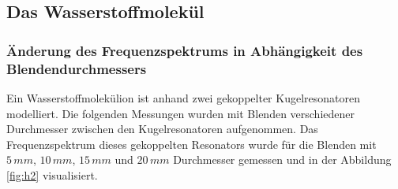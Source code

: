 \subsection{Das Wasserstoffmolekül}
\subsubsection{Änderung des Frequenzspektrums in Abhängigkeit des Blendendurchmessers}
\label{sec:h2peaks}
Ein Wasserstoffmolekülion ist anhand zwei gekoppelter Kugelresonatoren modelliert. Die folgenden Messungen wurden mit Blenden verschiedener Durchmesser zwischen den Kugelresonatoren 
aufgenommen. Das Frequenzspektrum dieses gekoppelten Resonators wurde für die Blenden mit $5\,mm$, $10\,mm$, $15\,mm$ und $20\,mm$ Durchmesser gemessen und in der Abbildung \ref{fig:h2} visualisiert. \\\\


